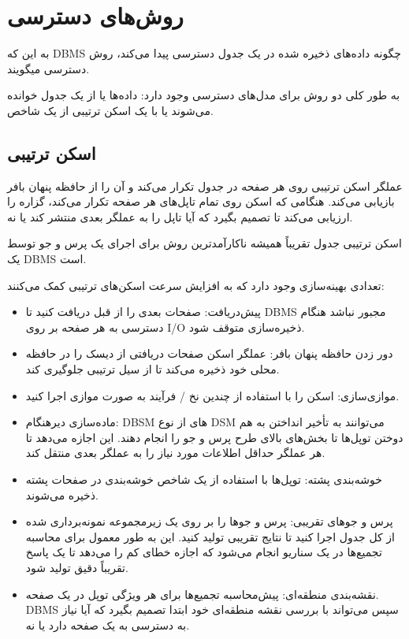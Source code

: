 \pagebreak

\section{روش‌های دسترسی}
به این که DBMS چگونه داده‌های ذخیره شده در یک جدول دسترسی پیدا می‌کند، روش دسترسی میگویند.

به طور کلی دو روش برای مدل‌های دسترسی وجود دارد: داده‌ها یا از یک جدول خوانده می‌شوند یا با یک اسکن ترتیبی از یک شاخص.
\subsection{اسکن ترتیبی}
عملگر اسکن ترتیبی روی هر صفحه در جدول تکرار می‌کند و آن را از حافظه پنهان بافر بازیابی می‌کند. هنگامی که اسکن روی تمام تاپل‌های هر صفحه تکرار می‌کند، گزاره را ارزیابی می‌کند تا تصمیم بگیرد که آیا تاپل را به عملگر بعدی منتشر کند یا نه.


اسکن ترتیبی جدول تقریباً همیشه ناکارآمدترین روش برای اجرای یک پرس و جو توسط یک DBMS است.


تعدادی بهینه‌سازی وجود دارد که به افزایش سرعت اسکن‌های ترتیبی کمک می‌کنند:
\begin{itemize}
	\item پیش‌دریافت: صفحات بعدی را از قبل دریافت کنید تا DBMS مجبور نباشد هنگام دسترسی به هر صفحه بر روی I/O ذخیره‌سازی متوقف شود.
	
	\item دور زدن حافظه پنهان بافر: عملگر اسکن صفحات دریافتی از دیسک را در حافظه محلی خود ذخیره می‌کند تا از سیل ترتیبی جلوگیری کند.
	
	\item موازی‌سازی: اسکن را با استفاده از چندین نخ / فرآیند به صورت موازی اجرا کنید.
	
	\item ماده‌سازی دیرهنگام:
	DBSM های 
	از نوع DSM
	می‌توانند به تأخیر انداختن به هم دوختن توپل‌ها تا بخش‌های بالای طرح پرس و جو را انجام دهند. این اجازه می‌دهد تا هر عملگر حداقل اطلاعات مورد نیاز را به عملگر بعدی منتقل کند.
	
	\item خوشه‌بندی پشته: توپل‌ها با استفاده از یک شاخص خوشه‌بندی در صفحات پشته ذخیره می‌شوند.
	
	\item پرس و جوهای تقریبی: پرس و جوها را بر روی یک زیرمجموعه نمونه‌برداری شده از کل جدول اجرا کنید تا نتایج تقریبی تولید کنید. این به طور معمول برای محاسبه تجمیع‌ها در یک سناریو انجام می‌شود که اجازه خطای کم را می‌دهد تا یک پاسخ تقریباً دقیق تولید شود.
	
	\item نقشه‌بندی منطقه‌ای: پیش‌محاسبه تجمیع‌ها برای هر ویژگی توپل در یک صفحه. DBMS سپس می‌تواند با بررسی نقشه منطقه‌ای خود ابتدا تصمیم بگیرد که آیا نیاز به دسترسی به یک صفحه دارد یا نه.
\end{itemize}

